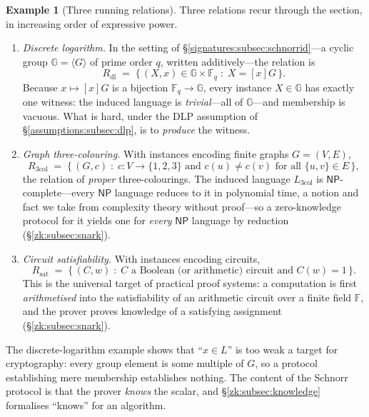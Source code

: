 \documentclass[11pt,a4paper]{article}
\theoremstyle{definition}
\newtheorem{example}[theorem]{Example}
\theoremstyle{remark}
\newcommand{\F}{\ensuremath{\mathbb{F}}}
\newcommand{\G}{\ensuremath{\mathbb{G}}}
\newcommand{\Fq}{\ensuremath{\mathbb{F}_{q}}}
\begin{document}
\begin{example}[Three running relations]\label{zk:exp:relations}
Three relations recur through the section, in increasing order of
expressive power.
\begin{enumerate}
\item \emph{Discrete logarithm.} In the setting of
  \S\ref{signatures:subsec:schnorrid}---a cyclic group
  \(\G = \langle G \rangle\) of prime order \(q\), written
  additively---the relation is
  \[
  R_{\mathrm{dl}}
  \;=\; \bigl\{\, (X, x) \in \G \times \Fq \;:\; X = [x]G \,\bigr\}.
  \]
  Because \(x \mapsto [x]G\) is a bijection \(\Fq \to \G\), every
  instance \(X \in \G\) has exactly one witness: the induced language
  is \emph{trivial}---all of \(\G\)---and membership is vacuous. What
  is hard, under the DLP assumption of
  \S\ref{assumptions:subsec:dlp}, is to \emph{produce} the witness.
\item \emph{Graph three-colouring.} With instances encoding finite
  graphs \(G = (V, E)\),
  \[
  R_{3\mathrm{col}}
  \;=\; \bigl\{\, (G, c) \;:\; c \colon V \to \{1,2,3\}
    \text{ and } c(u) \ne c(v) \text{ for all } \{u,v\} \in E
  \,\bigr\},
  \]
  the relation of \emph{proper} three-colourings. The induced
  language \(L_{3\mathrm{col}}\) is \(\mathsf{NP}\)-complete---every
  \(\mathsf{NP}\) language reduces to it in polynomial time, a
  notion and fact we take from complexity theory without proof---so
  a zero-knowledge protocol for it yields one for \emph{every}
  \(\mathsf{NP}\) language by reduction
  (\S\ref{zk:subsec:snark}).
\item \emph{Circuit satisfiability.} With instances encoding
  circuits,
  \[
  R_{\mathrm{sat}}
  \;=\; \bigl\{\, (C, w) \;:\; C \text{ a Boolean (or arithmetic)
    circuit and } C(w) = 1 \,\bigr\}.
  \]
  This is the universal target of practical proof systems: a
  computation is first \emph{arithmetised} into the satisfiability
  of an arithmetic circuit over a finite field \(\F\), and the
  prover proves knowledge of a satisfying assignment
  (\S\ref{zk:subsec:snark}).
\end{enumerate}
The discrete-logarithm example shows that ``\(x \in L\)'' is too weak
a target for cryptography: every group element is some multiple of
\(G\), so a protocol establishing mere membership establishes nothing.
The content of the Schnorr protocol is that the prover \emph{knows} the
scalar, and \S\ref{zk:subsec:knowledge} formalises ``knows'' for an
algorithm.
\end{example}
\end{document}
